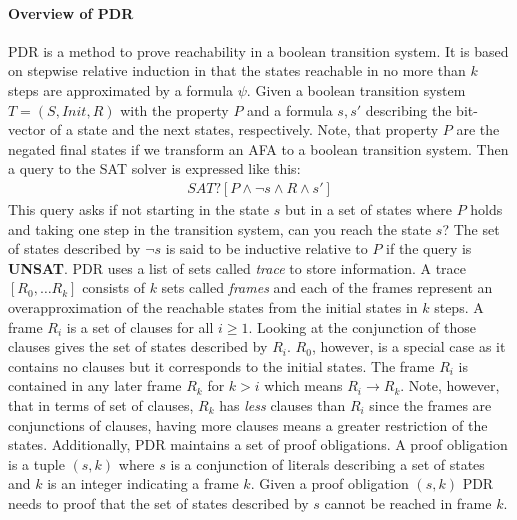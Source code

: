 \paragraph*{Overview of PDR} PDR is a method to prove reachability in a boolean transition system.
It is based on stepwise relative induction in that the states reachable in no more than $k$ steps are approximated by a formula $\psi$.
Given a boolean transition system $T = (S, Init, R)$ with the property $P$ and a formula $s,s'$ describing the bit-vector of a state and the next states, respectively. 
Note, that property $P$ are the negated final states if we transform an AFA to a boolean transition system.
Then a query to the SAT solver is expressed like this:
\begin{align*}
SAT?[P \wedge \lnot s \wedge R \wedge s']
\end{align*}
This query asks if not starting in the state $s$ but in a set of states where $P$ holds and taking one step in the transition system, can you reach the state $s$?
The set of states described by $\lnot s$ is said to be inductive relative to $P$ if the query is \textbf{UNSAT}.
PDR uses a list of sets called \emph{trace} to store information. A trace $[R_0,\dots R_k]$ consists of $k$ sets called \emph{frames} and each of the frames represent an overapproximation of the reachable states from the initial states in $k$ steps.
A frame $R_i$ is a set of clauses for all $i \geq 1$. 
Looking at the conjunction of those clauses gives the set of states described by $R_i$.
$R_0$, however, is a special case as it contains no clauses but it corresponds to the initial states.
The frame $R_i$ is contained in any later frame $R_k$ for $k > i$ which means $R_i \rightarrow R_k$. 
Note, however, that in terms of set of clauses, $R_k$ has \emph{less} clauses than $R_i$ since the frames are conjunctions of clauses, having more clauses means a greater restriction of the states.
Additionally, PDR maintains a set of proof obligations.
A proof obligation is a tuple $(s,k)$ where $s$ is a conjunction of literals describing a set of states and $k$ is an integer indicating a frame $k$. 
Given a proof obligation $(s,k)$ PDR needs to proof that the set of states described by $s$ cannot be reached in frame $k$.
